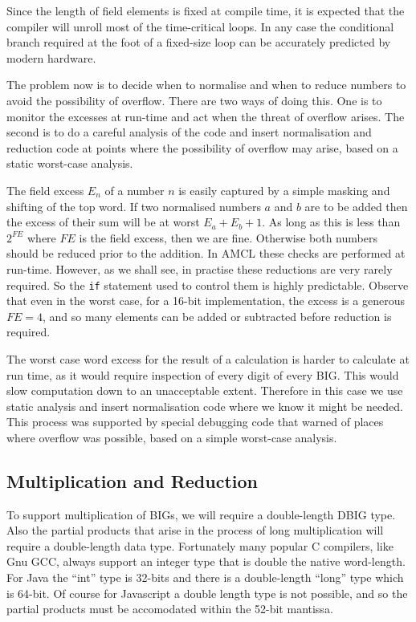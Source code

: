 \documentclass{llncs}
\begin{document}
Since the length of field elements is fixed at compile time, it is expected that the compiler will unroll most of the time-critical loops. In any case the conditional branch required at the foot of a 
fixed-size loop can be accurately predicted by modern hardware.

The problem now is to decide when to normalise and when to reduce numbers to avoid the possibility of overflow. There are two ways of doing this. One is to monitor the excesses at run-time and act when the 
threat of overflow arises. The second is to do a careful analysis of the code and insert normalisation and reduction code at points where the possibility of overflow may arise, based on a static worst-case 
analysis. 

The field excess $E_n$ of a number $n$ is easily captured by a simple masking and shifting of the top word. If two normalised numbers $a$ and $b$ are to be added then the excess of their sum will be at worst 
$E_a + E_b +1$. As long as this is less than $2^{FE}$ where $FE$ is the field excess, then we are fine. Otherwise both numbers should be reduced prior to the addition. In AMCL these checks are 
performed at run-time. However, as we shall see, in practise these reductions are very rarely required. So the {\tt if} statement used to control them is highly predictable. Observe that even
in the worst case, for a 16-bit implementation, the excess is a generous $FE=4$, and so many elements can be added or subtracted before reduction is required.

The worst case word excess for the result of a calculation is harder to calculate at run time, as it would require inspection of every digit of every {BIG}. This would slow computation down to an unacceptable extent. 
Therefore in this case
we use static analysis and insert normalisation code where we know it might be needed. This process was supported by special debugging code that warned of places where overflow was possible, based on a simple
worst-case analysis.

\subsection{Multiplication and Reduction}

To support multiplication of {BIG}s, we will require a double-length {DBIG} type. Also the partial products that arise in the process of long multiplication will require a double-length data type. Fortunately many 
popular C compilers, like Gnu {GCC}, always support an integer type that is double the native word-length. For Java the ``int'' type is 32-bits and there is a double-length ``long'' type which is 64-bit.
Of course for Javascript a double length type is not possible, and so the partial products must be accomodated within the 52-bit mantissa.
\end{document}

